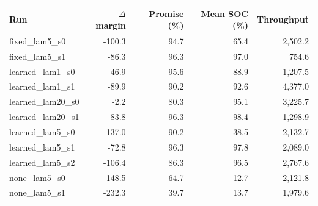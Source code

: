 \begin{tabular}{lrrrr}
\toprule
Run & $\Delta$ margin & Promise (\%) & Mean SOC (\%) & Throughput \\
\midrule
fixed\_lam5\_s0 & -100.3 & 94.7 & 65.4 & 2,502.2 \\
fixed\_lam5\_s1 & -86.3 & 96.3 & 97.0 & 754.6 \\
learned\_lam1\_s0 & -46.9 & 95.6 & 88.9 & 1,207.5 \\
learned\_lam1\_s1 & -89.9 & 90.2 & 92.6 & 4,377.0 \\
learned\_lam20\_s0 & -2.2 & 80.3 & 95.1 & 3,225.7 \\
learned\_lam20\_s1 & -83.8 & 96.3 & 98.4 & 1,298.9 \\
learned\_lam5\_s0 & -137.0 & 90.2 & 38.5 & 2,132.7 \\
learned\_lam5\_s1 & -72.8 & 96.3 & 97.8 & 2,089.0 \\
learned\_lam5\_s2 & -106.4 & 86.3 & 96.5 & 2,767.6 \\
none\_lam5\_s0 & -148.5 & 64.7 & 12.7 & 2,121.8 \\
none\_lam5\_s1 & -232.3 & 39.7 & 13.7 & 1,979.6 \\
\bottomrule
\end{tabular}

